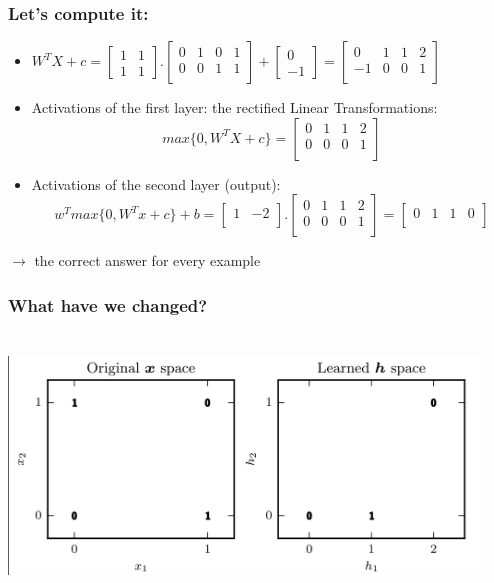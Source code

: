 \documentclass{beamer}
\begin{document}
\begin{frame}
	\frametitle{Let's compute it: }
	\begin{itemize}
		\item $ W^TX + c = \begin{bmatrix} 1 & 1\\
						1 & 1
				\end{bmatrix} .   \begin{bmatrix}
		0 & 1 & 0 & 1\\
	0 & 0 & 1 & 1 \\
\end{bmatrix} + \begin{bmatrix}
0\\
-1 
\end{bmatrix} =  \begin{bmatrix}
		0 & 1 & 1 & 2\\
	-1 & 0 & 0 & 1 \\
\end{bmatrix} $
\pause
\item Activations of the first layer: the rectified Linear Transformations:
	$$ max\{0,W^TX + c\} =\begin{bmatrix}
		0 & 1 & 1 & 2\\
	0 & 0 & 0 & 1 \\
\end{bmatrix}  $$
\pause
\item Activations of the second layer (output): 
	$$  w^Tmax\{0,W^Tx + c\} + b = \begin{bmatrix}
		1 & -2\\
\end{bmatrix}. \begin{bmatrix}
		0 & 1 & 1 & 2\\
	0 & 0 & 0 & 1 \\
\end{bmatrix} = \begin{bmatrix}
		0 & 1 & 1 & 0\\
\end{bmatrix}$$
	\end{itemize}
	$\rightarrow$ the correct answer for every example
\end{frame}
\begin{frame}
	\frametitle{What have we changed?}
	\includegraphics[width=125mm,height =70mm]{xor_graph2.png}
	
\end{frame}
\end{document}
